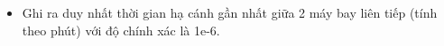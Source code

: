 \begin{itemize}
	\item     Ghi ra duy nhất thời gian hạ cánh gần nhất giữa 2 máy bay liên tiếp (tính theo phút) với độ chính xác là 1e-6.   
\end{itemize}